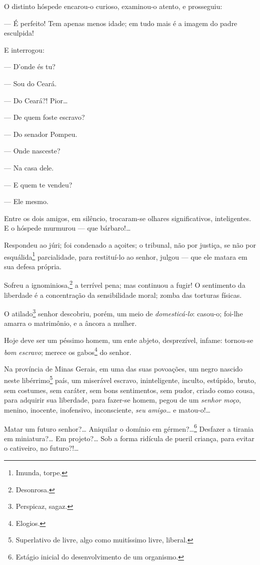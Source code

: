   O distinto hóspede encarou-o curioso, examinou-o atento, e prosseguiu:

--- É perfeito! Tem apenas menos idade; em tudo mais é a imagem do
padre esculpida!

E interrogou:

  --- D'onde és tu?

  --- Sou do Ceará.

  --- Do Ceará?! Pior\ldots{}

  --- De quem foste escravo?

  --- Do senador Pompeu.

  --- Onde nasceste?

  --- Na casa dele.

  --- E quem te vendeu?

  --- Ele mesmo.

  Entre os dois amigos, em silêncio, trocaram-se olhares significativos,
  inteligentes. E o hóspede murmurou --- que bárbaro!\ldots{}

  Respondeu ao júri; foi condenado a açoites; o tribunal, não por
    justiça, se não por esquálida\footnote{Imunda, torpe.} parcialidade,
    para restituí-lo ao senhor, julgou --- que ele matara em sua defesa
    própria.

  Sofreu a ignominiosa,\footnote{Desonrosa.} a terrível pena; mas
  continuou a fugir! O sentimento da liberdade é a concentração da
  sensibilidade moral; zomba das torturas físicas.

  O atilado\footnote{Perspicaz, sagaz.} senhor descobriu, porém, um
    meio de \emph{domesticá-lo}: casou-o; foi-lhe amarra o matrimônio, e a
    âncora a mulher.

  Hoje deve ser um péssimo homem, um ente abjeto, desprezível, infame:
  tornou-se \emph{bom escravo}; merece os gabos\footnote{Elogios.} do
  senhor.

\asterisc

  Na província de Minas Gerais, em uma das suas povoações, um negro
  nascido neste libérrimo\footnote{Superlativo de livre,
  algo como muitíssimo livre, liberal.} país, um miserável escravo,
  ininteligente, inculto, estúpido, bruto, sem costumes, sem caráter,
  sem bons sentimentos, sem pudor, criado como cousa, para adquirir sua
  liberdade, para fazer-se homem, pegou de um \emph{senhor moço},
  menino, inocente, inofensivo, inconsciente, \emph{seu amigo}\ldots{} e
  matou-o!\ldots{}

  Matar um futuro senhor?\ldots{} Aniquilar o domínio em gérmen?\ldots{}\footnote{
    Estágio inicial do desenvolvimento de um organismo.} Desfazer a
  tirania em miniatura?\ldots{} Em projeto?\ldots{} Sob a forma ridícula de pueril
  criança, para evitar o cativeiro, no futuro?!\ldots{}

